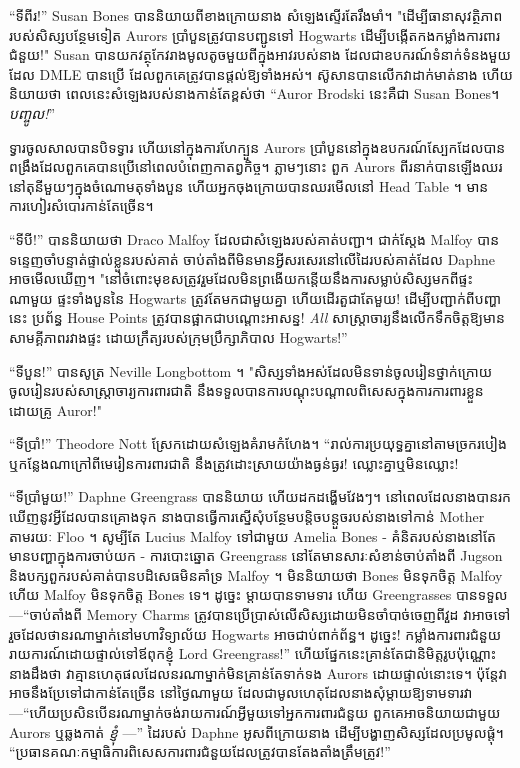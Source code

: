 “ទីពីរ!” Susan Bones បាននិយាយពីខាងក្រោយនាង សំឡេងស្ទើរតែរឹងមាំ។ "ដើម្បីធានាសុវត្ថិភាពរបស់សិស្សបន្ថែមទៀត Aurors ប្រាំបួនត្រូវបានបញ្ជូនទៅ Hogwarts ដើម្បីបង្កើតកងកម្លាំងការពារជំនួយ!" Susan បានយកវត្ថុកែវរាងមូលតូចមួយពីក្នុងអាវរបស់នាង ដែលជាឧបករណ៍ទំនាក់ទំនងមួយដែល DMLE បានប្រើ ដែលពួកគេត្រូវបានផ្តល់ឱ្យទាំងអស់។ ស៊ូសានបានលើកវាដាក់មាត់នាង ហើយនិយាយថា ពេលនេះសំឡេងរបស់នាងកាន់តែខ្ពស់ថា “Auror Brodski នេះគឺជា Susan Bones។ \emph{បញ្ចូល!}”

ទ្វារចូលសាលបានបិទទ្វារ ហើយនៅក្នុងការហែក្បួន Aurors ប្រាំបួននៅក្នុងឧបករណ៍ស្បែកដែលបានពង្រឹងដែលពួកគេបានប្រើនៅពេលបំពេញកាតព្វកិច្ច។ ភ្លាមៗនោះ ពួក Aurors ពីរនាក់បានឡើងឈរនៅតុនីមួយៗក្នុងចំណោមតុទាំងបួន ហើយអ្នកចុងក្រោយបានឈរមើលនៅ Head Table ។ មានការហៀរសំបោរកាន់តែច្រើន។

“ទីបី!” បាននិយាយថា Draco Malfoy ដែលជាសំឡេងរបស់គាត់បញ្ជា។ ជាក់ស្តែង Malfoy បានទន្ទេញចាំបន្ទាត់ផ្ទាល់ខ្លួនរបស់គាត់ ចាប់តាំងពីមិនមានអ្វីសរសេរនៅលើដៃរបស់គាត់ដែល Daphne អាចមើលឃើញ។ "នៅចំពោះមុខសត្រូវរួមដែលមិនព្រងើយកន្តើយនឹងការសម្លាប់សិស្សមកពីផ្ទះណាមួយ ផ្ទះទាំងបួននៃ Hogwarts ត្រូវតែមកជាមួយគ្នា ហើយដើរតួជាតែមួយ! ដើម្បី​បញ្ជាក់​ពី​បញ្ហា​នេះ ប្រព័ន្ធ House Points ត្រូវ​បាន​ផ្អាក​ជា​បណ្ដោះអាសន្ន! \emph{All} សាស្រ្តាចារ្យនឹងលើកទឹកចិត្តឱ្យមានសាមគ្គីភាពរវាងផ្ទះ ដោយក្រឹត្យរបស់ក្រុមប្រឹក្សាភិបាល Hogwarts!”

“ទីបួន!” បានសូត្រ Neville Longbottom ។ "សិស្សទាំងអស់ដែលមិនទាន់ចូលរៀនថ្នាក់ក្រោយចូលរៀនរបស់សាស្ត្រាចារ្យការពារជាតិ នឹងទទួលបានការបណ្តុះបណ្តាលពិសេសក្នុងការការពារខ្លួនដោយគ្រូ Auror!"

“ទីប្រាំ!” Theodore Nott ស្រែក​ដោយ​សំឡេង​គំរាមកំហែង។ “រាល់ការប្រយុទ្ធគ្នានៅតាមច្រករបៀង ឬកន្លែងណាក្រៅពីមេរៀនការពារជាតិ នឹងត្រូវដោះស្រាយយ៉ាងធ្ងន់ធ្ងរ! ឈ្លោះគ្នាឬមិនឈ្លោះ!

“ទីប្រាំមួយ!” Daphne Greengrass បាននិយាយ ហើយដកដង្ហើមវែងៗ។ នៅពេលដែលនាងបានរកឃើញនូវអ្វីដែលបានគ្រោងទុក នាងបានធ្វើការស្នើសុំបន្ថែមបន្តិចបន្តួចរបស់នាងទៅកាន់ Mother តាមរយៈ Floo ។ សូម្បីតែ Lucius Malfoy ទៅជាមួយ Amelia Bones - គំនិតរបស់នាងនៅតែមានបញ្ហាក្នុងការចាប់យក - ការបោះឆ្នោត Greengrass នៅតែមានសារៈសំខាន់ចាប់តាំងពី Jugson និងបក្សពួករបស់គាត់បានបដិសេធមិនគាំទ្រ Malfoy ។ មិននិយាយថា Bones មិនទុកចិត្ត Malfoy ហើយ Malfoy មិនទុកចិត្ត Bones ទេ។ ដូច្នេះ ម្តាយបានទាមទារ ហើយ Greengrasses បានទទួល—“ចាប់តាំងពី Memory Charms ត្រូវបានប្រើប្រាស់លើសិស្សដោយមិនចាំបាច់ចេញពីវួដ វាអាចទៅរួចដែលថានរណាម្នាក់នៅមហាវិទ្យាល័យ Hogwarts អាចជាប់ពាក់ព័ន្ធ។ ដូច្នេះ! កម្លាំងការពារជំនួយរាយការណ៍ដោយផ្ទាល់ទៅឪពុកខ្ញុំ Lord Greengrass!” ហើយផ្នែកនេះគ្រាន់តែជានិមិត្តរូបប៉ុណ្ណោះ នាងដឹងថា វាគ្មានហេតុផលដែលនរណាម្នាក់មិនគ្រាន់តែទាក់ទង Aurors ដោយផ្ទាល់នោះទេ។ ប៉ុន្តែវាអាចនឹងប្រែទៅជាកាន់តែច្រើន នៅថ្ងៃណាមួយ ដែលជាមូលហេតុដែលនាងសុំម្តាយឱ្យទាមទារវា—“ហើយប្រសិនបើនរណាម្នាក់ចង់រាយការណ៍អ្វីមួយទៅអ្នកការពារជំនួយ ពួកគេអាចនិយាយជាមួយ Aurors ឬឆ្លងកាត់ \emph{ខ្ញុំ }—” ដៃរបស់ Daphne អូសពីក្រោយនាង ដើម្បីបង្ហាញសិស្សដែលប្រមូលផ្តុំ។ “ប្រធានគណៈកម្មាធិការពិសេសការពារជំនួយដែលត្រូវបានតែងតាំងត្រឹមត្រូវ!”

